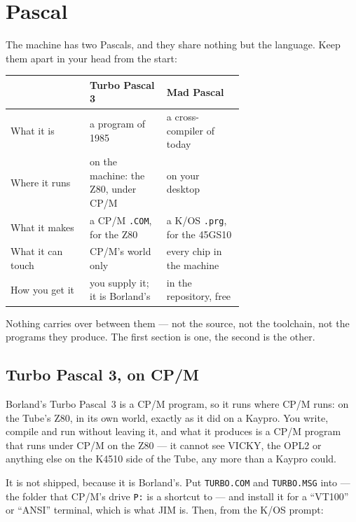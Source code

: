 \chapter{Pascal}\label{cha:pascal}

The machine has two Pascals, and they share nothing but the language.
Keep them apart in your head from the start:

\begin{center}
\small
\begin{tabular}{@{}l >{\raggedright\arraybackslash}p{0.33\linewidth} >{\raggedright\arraybackslash}p{0.33\linewidth}@{}}
\toprule
 & \textbf{Turbo Pascal 3} & \textbf{Mad Pascal} \\
\midrule
What it is & a program of 1985 & a cross-compiler of today \\
Where it runs & on the machine: the Z80, under CP/M & on your desktop \\
What it makes & a CP/M \texttt{.COM}, for the Z80 & a K/OS \texttt{.prg}, for the 45GS10 \\
What it can touch & CP/M's world only & every chip in the machine \\
How you get it & you supply it; it is Borland's & in the repository, free \\
\bottomrule
\end{tabular}
\end{center}

\noindent Nothing carries over between them --- not the source, not the
toolchain, not the programs they produce. The first section is one, the
second is the other.

\section{Turbo Pascal 3, on CP/M}
Borland's Turbo Pascal~3 is a CP/M program, so it runs where CP/M runs:
on the Tube's Z80, in its own world, exactly as
it did on a Kaypro. You write, compile and run without leaving it, and
what it produces is a CP/M program that runs under CP/M on the Z80 ---
it cannot see VICKY, the OPL2 or anything else on the K4510 side of the
Tube, any more than a Kaypro could.

It is not shipped, because it is Borland's. Put \texttt{TURBO.COM} and
\texttt{TURBO.MSG} into  --- the folder that CP/M's
drive \verb|P:| is a shortcut to --- and install it for a ``VT100'' or
``ANSI'' terminal, which is what JIM is. Then, from the K/OS prompt:

